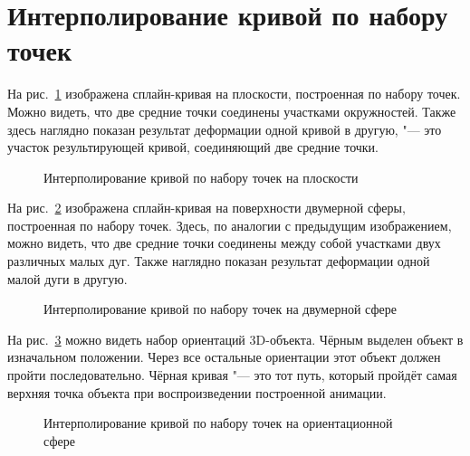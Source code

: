 \section{Интерполирование кривой по набору точек}

На рис.~\ref{picture-by-points-plane} изображена сплайн-кривая на плоскости, построенная по набору точек. Можно видеть,
что две средние точки соединены участками окружностей. Также здесь наглядно показан результат деформации одной кривой
в другую, "--- это участок результирующей кривой, соединяющий две средние точки.

\begin{figure}[h!]
\caption{Интерполирование кривой по набору точек на плоскости}
\label{picture-by-points-plane}
\end{figure}

На рис.~\ref{picture-by-points-two-dimension} изображена сплайн-кривая на поверхности двумерной сферы, построенная
по набору точек. Здесь, по аналогии с предыдущим изображением, можно видеть, что две средние точки соединены между собой
участками двух различных малых дуг. Также наглядно показан результат деформации одной малой дуги в другую.

\begin{figure}[h!]
\caption{Интерполирование кривой по набору точек на двумерной сфере}
\label{picture-by-points-two-dimension}
\end{figure}

На рис.~\ref{picture-by-points-orientation} можно видеть набор ориентаций 3D-объекта. Чёрным выделен объект
в изначальном положении. Через все остальные ориентации этот объект должен пройти последовательно. Чёрная
кривая "--- это тот путь, который пройдёт самая верхняя точка объекта при воспроизведении построенной анимации.

\begin{figure}[h!]
\caption{Интерполирование кривой по набору точек на ориентационной сфере}
\label{picture-by-points-orientation}
\end{figure}
